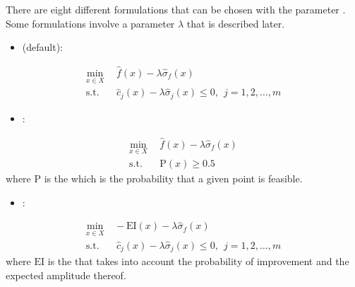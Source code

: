 \documentclass[letterpaper,10pt,english]{sphinxmanual}
\begin{document}
\begin{DUlineblock}{0em}
\item[] There are eight different formulations that can be chosen with the parameter . Some formulations involve a parameter \(\lambda\) that is described later.
\end{DUlineblock}
\begin{itemize}
\item {} 
\sphinxAtStartPar
{} (default):

\end{itemize}
\begin{equation*}
\begin{split}\min_{x\in X}&\ \ \hat f(x)-\lambda\hat\sigma_f(x) \\
\mathrm{s.t.}&\ \ \hat c_j(x)-\lambda\hat\sigma_j(x)\leq0,\ \ j=1,2,\dots,m\end{split}
\end{equation*}\begin{itemize}
\item {} 
\sphinxAtStartPar
{}:

\end{itemize}
\begin{equation*}
\begin{split}\min_{x\in X}&\ \ \hat f(x)-\lambda\hat\sigma_f(x) \\
\mathrm{s.t.}&\ \ \mathrm{P}(x)\geq 0.5\end{split}
\end{equation*}
\sphinxAtStartPar
where \(\mathrm{P}\) is the  which is the probability that a given point is feasible.
\begin{itemize}
\item {} 
\sphinxAtStartPar
{}:

\end{itemize}
\begin{equation*}
\begin{split}\min_{x\in X}&\ -\mathrm{EI}(x)-\lambda\hat\sigma_f(x) \\
\mathrm{s.t.}&\ \ \hat c_j(x)-\lambda\hat\sigma_j(x)\leq0,\ \ j=1,2,\dots,m\end{split}
\end{equation*}
\sphinxAtStartPar
where \(\mathrm{EI}\) is the  that takes into account the probability of improvement and
the expected amplitude thereof.
\end{document}
